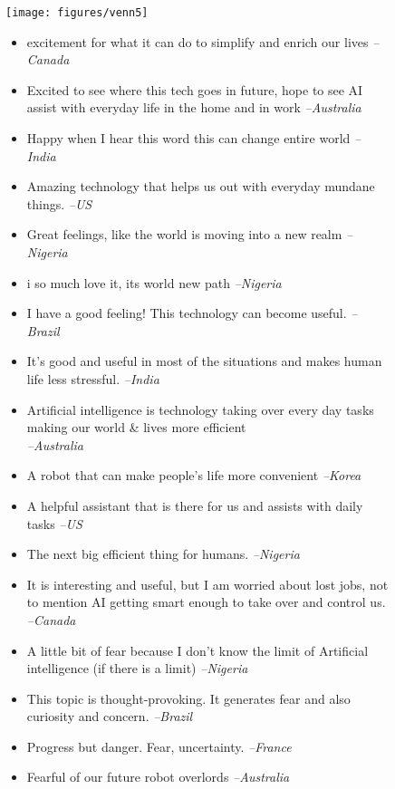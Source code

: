 \documentclass[sigconf]{acmart}
\newcommand\aff[1]{\textcolor{darkplum}{{\emph{--#1}}}}
\newenvironment{lq1}
{ \begin{itemize}[leftmargin = 0em, label={}]
    \fontsize{8pt}{8.6pt}\selectfont
    \setlength{\itemsep}{2pt}
    \setlength{\parskip}{2pt}
    \setlength{\parsep}{2pt}       }
{ \end{itemize}                    }
\begin{document}
\begin{figure*}[!ht]
\centering
  \texttt{[image: figures/venn5]}

  \setlength\columnsep{15pt}
\begin{multicols}{4}

\begin{lq1}
\item excitement for what it can do to simplify and enrich our lives \aff{Canada}
\item Excited to see where this tech goes in future, hope to see AI assist with everyday life in the home and in work \aff{Australia}
\item Happy when I hear this word this can change entire world \aff{India}
\item Amazing technology that helps us out with everyday mundane things. \aff{US}
\item Great feelings, like the world is moving into a new realm \aff{Nigeria}
\item i so much love it, its world new path \aff{Nigeria}
\end{lq1}

\columnbreak

\begin{lq1}
\item I have a good feeling! This technology can become useful. \aff{Brazil}
\item It's good and useful in most of the situations and makes human life less stressful. \aff{India}
\item Artificial intelligence is technology taking over every day tasks making our world \& lives more efficient\\\aff{Australia}
\item A robot that can make people's life more convenient \aff{Korea}
\item A helpful assistant that is there for us and assists with daily tasks \aff{US}
\item The next big efficient thing for humans. \aff{Nigeria}
\end{lq1}

\columnbreak

\begin{lq1}
\item It is interesting and useful, but I am worried about lost jobs, not to mention AI getting smart enough to take over and control us. \aff{Canada}
\item A little bit of fear because I don't know the limit of Artificial intelligence (if there is a limit) \aff{Nigeria}
\item This topic is thought-provoking. It generates fear and also curiosity and concern. \aff{Brazil}
\item Progress but danger. Fear, uncertainty. \aff{France}
\item Fearful of our future robot overlords \aff{Australia}
\end{lq1}


\end{multicols}
\end{figure*}
\end{document}
